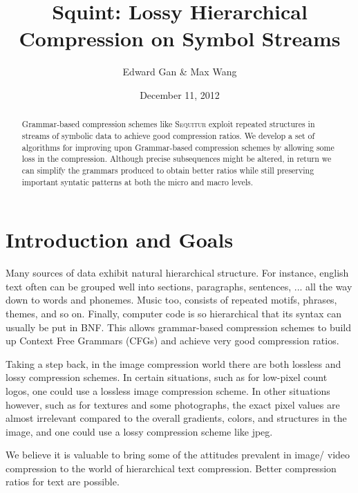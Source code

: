 \documentclass[11pt]{article}
\newcommand{\Sequitur}{\textsc{Sequitur}\xspace}
\begin{document}


\title{Squint: Lossy Hierarchical Compression on Symbol Streams}
\author{Edward Gan \& Max Wang}
\date{December 11, 2012}
\maketitle

\begin{abstract}

Grammar-based compression schemes like \Sequitur exploit repeated structures in
streams of symbolic data to achieve good compression ratios.  We develop a set
of algorithms for improving upon Grammar-based compression schemes by allowing
some loss in the compression. Although precise subsequences might be altered,
in return we can simplify the grammars produced to obtain better ratios while
still preserving important syntatic patterns at both the micro and macro
levels.

\end{abstract}

\tableofcontents

\section{Introduction and Goals}

Many sources of data exhibit natural hierarchical structure. For instance,
english text often can be grouped well into sections, paragraphs, sentences,
...  all the way down to words and phonemes. Music too, consists of repeated
motifs, phrases, themes, and so on. Finally, computer code is so hierarchical
that its syntax can usually be put in BNF. This allows grammar-based
compression schemes to build up Context Free Grammars (CFGs) and achieve very
good compression ratios.

Taking a step back, in the image compression world there are both lossless and
lossy compression schemes. In certain situations, such as for low-pixel count
logos, one could use a lossless image compression scheme. In other situations
however, such as for textures and some photographs, the exact pixel values are
almost irrelevant compared to the overall gradients, colors, and structures in
the image, and one could use a lossy compression scheme like jpeg.

We believe it is valuable to bring some of the attitudes prevalent in image/
video compression to the world of hierarchical text compression. Better
compression ratios for text are possible.
\end{document}
